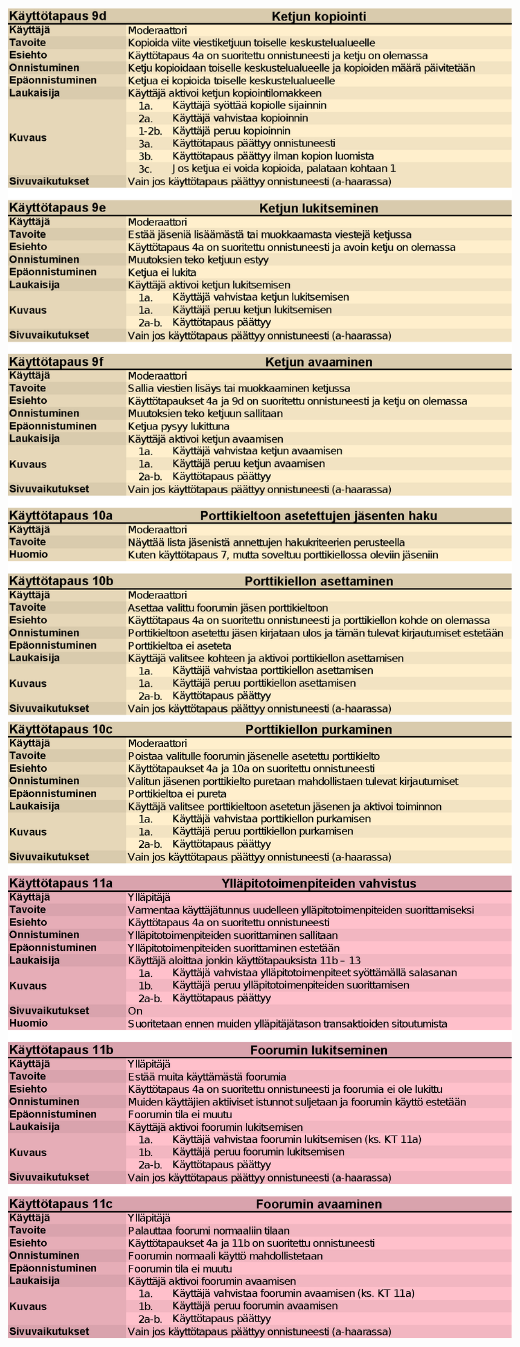 \documentclass[11pt]{article}
\begin{document}
		\includegraphics[trim = 21mm 0mm 0mm 25mm]{kayttotapausmalli-sivu-5.eps}\\
		\includegraphics[trim = 21mm 0mm 0mm 25mm]{kayttotapausmalli-sivu-6.eps}\\
\end{document}
